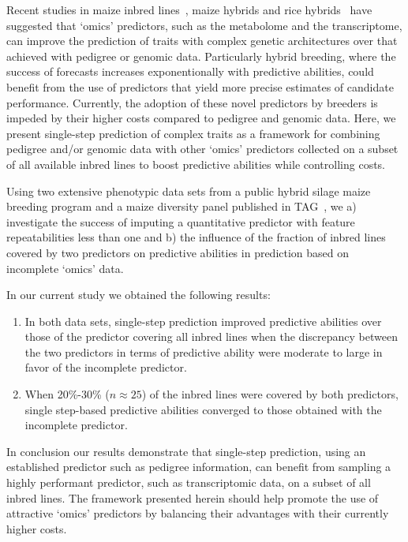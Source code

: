 \documentclass[12pt,titlepage]{article}
\begin{document}
Recent studies in maize inbred lines~\cite{Guo2016}, maize hybrids
\cite{Zenke-Philippi2017,Westhues2017} and rice hybrids~\cite{Dan2016,Xu2016}
have suggested that `omics' predictors, such as the metabolome and the
transcriptome, can improve the prediction of traits with complex genetic 
architectures over that achieved with pedigree or genomic data.
Particularly hybrid breeding, where the success of forecasts increases
exponentionally with predictive abilities, could benefit from the use of
predictors that yield more precise estimates of candidate performance.
Currently, the adoption of these novel predictors by breeders is impeded
by their higher costs compared to pedigree and genomic data.
Here, we present single-step prediction of complex traits as a framework for
combining pedigree and/or genomic data with other `omics' predictors collected
on a subset of all available inbred lines to boost predictive abilities while
controlling costs.

Using two extensive phenotypic data sets from a public hybrid silage maize
breeding program and a maize diversity panel published in TAG~\cite{Westhues2017,
Guo2016}, we a) investigate the success of imputing a quantitative predictor
with feature repeatabilities less than one and b) the influence of the fraction
of inbred lines covered by two predictors on predictive abilities in prediction
based on incomplete `omics' data.

In our current study we obtained the following results:

\begin{enumerate}
\item In both data sets, single-step prediction improved predictive abilities
	over those of the predictor covering all inbred lines when the
	discrepancy between the	two predictors in terms of predictive ability
	were moderate to large in favor of the incomplete predictor.
\item When 20\%-30\% ($n \approx 25$) of the inbred lines were covered by both
	predictors, single step-based predictive abilities converged to those
	obtained with the incomplete predictor.
\end{enumerate}

In conclusion our results demonstrate that single-step prediction, using
an established predictor such as pedigree information, can benefit from sampling
a highly performant predictor, such as transcriptomic data, on a subset of all
inbred lines.
The framework presented herein should help promote the use of attractive
`omics' predictors by balancing their advantages with their currently higher
costs.
\end{document}
